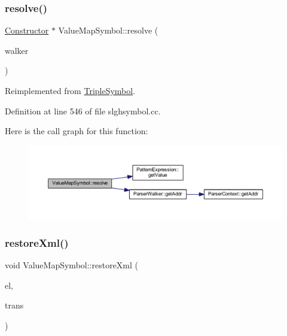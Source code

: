 \subsubsection{\texorpdfstring{resolve()}{resolve()}}
{\footnotesize\ttfamily \mbox{\hyperlink{class_constructor}{Constructor}} $\ast$ Value\+Map\+Symbol\+::resolve (\begin{DoxyParamCaption}\item[{\mbox{\hyperlink{class_parser_walker}{Parser\+Walker}} \&}]{walker }\end{DoxyParamCaption})\hspace{0.3cm}{\ttfamily [virtual]}}



Reimplemented from \mbox{\hyperlink{class_triple_symbol_adc7ba86d4674c1b3cc8894cfcac33bf1}{Triple\+Symbol}}.



Definition at line 546 of file slghsymbol.\+cc.

Here is the call graph for this function\+:
\nopagebreak
\begin{figure}[H]
\begin{center}
\leavevmode
\includegraphics[width=350pt]{class_value_map_symbol_a7287386595bd0d870f78e83490637c53_cgraph}
\end{center}
\end{figure}
\mbox{\label{class_value_map_symbol_a713f4ece8b103374e08d4b53f9ef174b}} 
\subsubsection{\texorpdfstring{restoreXml()}{restoreXml()}}
{\footnotesize\ttfamily void Value\+Map\+Symbol\+::restore\+Xml (\begin{DoxyParamCaption}\item[{const \mbox{\hyperlink{class_element}{Element}} $\ast$}]{el,  }\item[{\mbox{\hyperlink{class_sleigh_base}{Sleigh\+Base}} $\ast$}]{trans }\end{DoxyParamCaption})\hspace{0.3cm}{\ttfamily [virtual]}}



